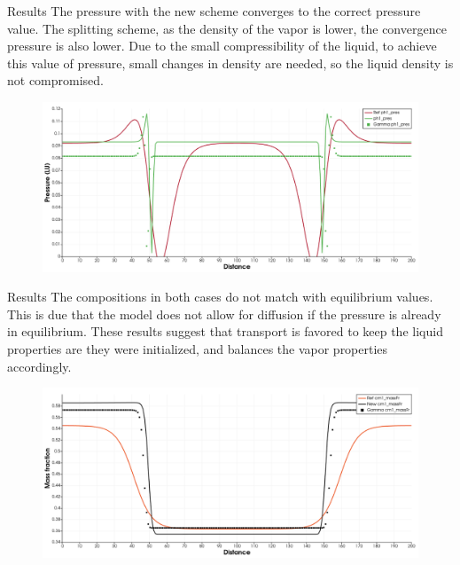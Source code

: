 \documentclass[8pt]{beamer}
\begin{document}
	\begin{frame}{Results}
		The pressure with the new scheme converges to the correct pressure value. The splitting scheme, as the density of the vapor is lower, the convergence pressure is also lower. Due to the small compressibility of the liquid, to achieve this value of pressure, small changes in density are needed, so the liquid density is not compromised.
		\begin{figure}
			\centering
			\includegraphics[width=\textwidth]{pics/1dnewForce/pressure.png}
		\end{figure}
	\end{frame}

	\begin{frame}{Results}
		The compositions in both cases do not match with equilibrium values. This is due that the model does not allow for diffusion if the pressure is already in equilibrium. These results suggest that transport is favored to keep the liquid properties are they were initialized, and balances the vapor properties accordingly.
		\begin{figure}
			\centering
			\includegraphics[width=\textwidth]{pics/1dnewForce/massFraction.png}
		\end{figure}
	\end{frame}
\end{document}
